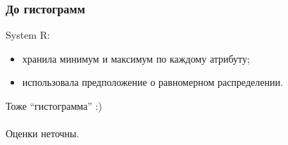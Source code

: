 \documentclass{beamer}
\begin{document}

\begin{frame}
\frametitle{До гистограмм}

System R:

\begin{itemize}
  \setlength\itemsep{1em}
  \item хранила минимум и максимум по каждому атрибуту;
  \item использовала предположение о равномерном распределении.
\end{itemize}

Тоже ``гистограмма'' :)\\~\\

Оценки неточны.

\end{frame}
\end{document}

